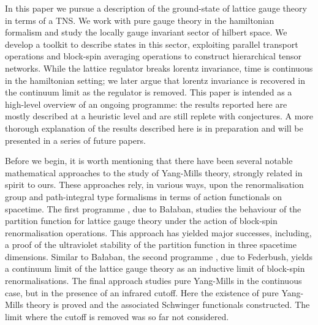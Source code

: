 \documentclass[twocolumn,lengthcheck,superscriptaddress]{revtex4-1}
\theoremstyle{definition}
\theoremstyle{remark}
\begin{document}
In this paper we pursue a description of the ground-state of lattice gauge theory in terms of a TNS. We work with pure gauge theory in the hamiltonian formalism \cite{kogut:1975a} and study the locally gauge invariant sector of hilbert space.  We develop a toolkit to describe states in this sector, exploiting parallel transport operations and block-spin averaging operations to construct hierarchical tensor networks. While the lattice regulator breaks lorentz invariance, time is continuous in the hamiltonian setting; we later argue that lorentz invariance is recovered in the continuum limit as the regulator is removed. This paper is intended as a high-level overview of an ongoing programme: the results reported here are mostly described at a heuristic level and are still replete with conjectures. A more thorough explanation of the results described here is in preparation and will be presented in a series of future papers.

Before we begin, it is worth mentioning that there have been several notable mathematical approaches to the study of Yang-Mills theory, strongly related in spirit to ours. These approaches rely, in various ways, upon the renormalisation group \cite{wilson:1975a} and path-integral type formalisms in terms of action functionals on spacetime. The first programme \cite{balaban:1985a,balaban:1988a,balaban:1984a,balaban:1984b,balaban:1985b,balaban:1985c,balaban:1985d,balaban:1989a,balaban:1989b,balaban:1987a,balaban:1988b}, due to Ba{\l}aban, studies the behaviour of the partition function for lattice gauge theory under the action of block-spin renormalisation operations. This approach has yielded major successes, including, a proof of the ultraviolet stability of the partition function \cite{balaban:1985d} in three spacetime dimensions. Similar to Ba{\l}aban, the second programme \cite{federbush:1987a,federbush:1986a,federbush:1987b,federbush:1987c,federbush:1988a,federbush:1990a}, due to Federbush, yields a continuum limit of the lattice gauge theory as an inductive limit of block-spin renormalisations. The final approach \cite{magnen:1993a} studies pure Yang-Mills in the continuous case, but in the presence of an infrared cutoff. Here the existence of pure Yang-Mills theory is proved and the associated Schwinger functionals constructed. The limit where the cutoff is removed was so far not considered.
\end{document}
